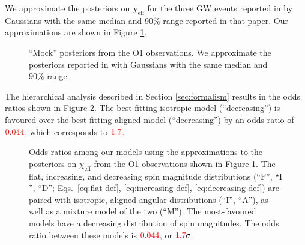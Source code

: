 \documentclass[modern]{aastex61}
\newcommand{\chieff}{\chi_\mathrm{eff}}
\newcommand{\checkme}[1]{\textcolor{red}{#1}}
\newcommand{\OOneSigmaIsoAligned}{\checkme{1.7}}
\newcommand{\OOneOddsIsoAligned}{\checkme{0.044}}
\begin{document}
We approximate the posteriors on $\chieff$ for the three \ac{GW}
events reported in \cite{O1-BBH} by Gaussians with the same median and
90\% range reported in that paper.  Our approximations are shown in
Figure \ref{fig:O1-posteriors}.

\begin{figure}
  \caption{\label{fig:O1-posteriors} ``Mock'' posteriors from the O1
    observations.  We approximate the posteriors reported in
    \citet{O1-BBH} with Gaussians with the same median and 90\%
    range.}
\end{figure}

The hierarchical analysis described in Section \ref{sec:formalism}
results in the odds ratios shown in Figure \ref{fig:O1-odds}.  The
best-fitting isotropic model (``decreasing'') is favoured over the
best-fitting aligned model (``decreasing'') by an odds ratio of
$\OOneOddsIsoAligned$, which corresponds to $\OOneSigmaIsoAligned$.


\begin{figure}
  \caption{Odds ratios among our models using the approximations
    to the posteriors on $\chieff$ from the O1 observations shown in
    Figure \ref{fig:O1-posteriors}.  The flat, increasing, and
    decreasing spin magnitude distributions (``$\mathrm{F}$'', ``$\mathrm{I}$'', ``$\mathrm{D}$'';
    Eqs.\ \eqref{eq:flat-def}, \eqref{eq:increasing-def},
    \eqref{eq:decreasing-def}) are paired with isotropic, aligned
    angular distributions (``$\mathrm{I}$'', ``$\mathrm{A}$''), as well as a mixture model of the two (``$\mathrm{M}$'').  The most-favoured models have a decreasing distribution of spin magnitudes.  The odds ratio between these
    models is $\OOneOddsIsoAligned$, or $\OOneSigmaIsoAligned\sigma$.}
  \label{fig:O1-odds}
\end{figure}
\end{document}

